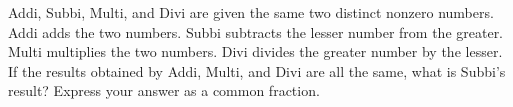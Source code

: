 Addi, Subbi, Multi, and Divi are given the same two distinct nonzero numbers. Addi adds the two numbers. Subbi subtracts the lesser number from the greater. Multi multiplies the two numbers. Divi divides the greater number by the lesser. If the results obtained by Addi, Multi, and Divi are all the same, what is Subbi's result? Express your answer as a common fraction.
